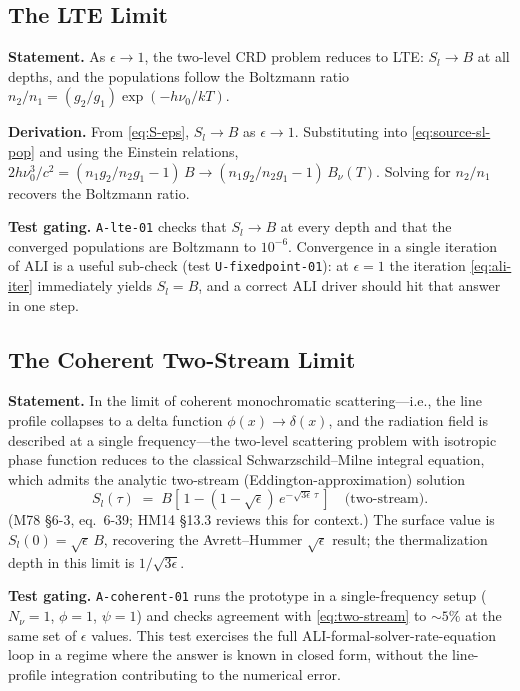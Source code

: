 \documentclass[11pt]{article}
\newcommand{\Bnu}{B_{\nu}}
\begin{document}
\subsection{The LTE Limit}

\textbf{Statement.} As $\epsilon \to 1$, the two-level CRD problem reduces to
LTE: $S_l \to B$ at all depths, and the populations follow the Boltzmann
ratio $n_2 / n_1 = (g_2/g_1) \exp(-h\nu_0/kT)$.

\textbf{Derivation.} From \eqref{eq:S-eps}, $S_l \to B$ as $\epsilon \to 1$.
Substituting into \eqref{eq:source-sl-pop} and using the Einstein relations,
$2 h\nu_0^3/c^2 = (n_1 g_2 / n_2 g_1 - 1)\, B \to (n_1 g_2 / n_2 g_1 - 1)\, \Bnu(T)$.
Solving for $n_2 / n_1$ recovers the Boltzmann ratio.

\textbf{Test gating.} \texttt{A-lte-01} checks that $S_l \to B$ at
every depth and that the converged populations are Boltzmann to
$10^{-6}$.  Convergence in a single iteration of ALI is a useful
sub-check (test \texttt{U-fixedpoint-01}): at $\epsilon = 1$ the
iteration \eqref{eq:ali-iter} immediately yields $S_l = B$, and a
correct ALI driver should hit that answer in one step.

\subsection{The Coherent Two-Stream Limit}
\label{sec:coherent-twostream}

\textbf{Statement.} In the limit of coherent monochromatic scattering---i.e.,
the line profile collapses to a delta function $\phi(x) \to \delta(x)$, and
the radiation field is described at a single frequency---the two-level
scattering problem with isotropic phase function reduces to the classical
Schwarzschild--Milne integral equation, which admits the analytic two-stream
(Eddington-approximation) solution
\begin{equation}
S_l(\tau) \;=\; B\!\left[\,1 - (1 - \sqrt{\epsilon})\,e^{-\sqrt{3\epsilon}\,\tau}\,\right]
\quad \text{(two-stream)}.
\label{eq:two-stream}
\end{equation}
(M78 §6-3, eq.~6-39; HM14 §13.3 reviews this for context.) The surface value
is $S_l(0) = \sqrt{\epsilon}\, B$, recovering the Avrett--Hummer
$\sqrt{\epsilon}$ result; the thermalization depth in this limit is
$1/\sqrt{3\epsilon}$.

\textbf{Test gating.} \texttt{A-coherent-01} runs the prototype in a
single-frequency setup ($N_\nu = 1$, $\phi = 1$, $\psi = 1$) and checks
agreement with \eqref{eq:two-stream} to $\sim 5\%$ at the same set of
$\epsilon$ values.  This test exercises the full
ALI-formal-solver-rate-equation loop in a regime where the answer is
known in closed form, without the line-profile integration contributing
to the numerical error.
\end{document}
